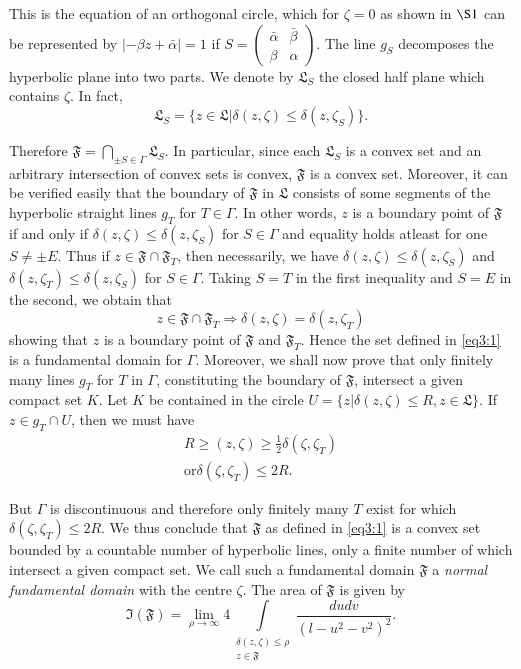 This is the equation of an orthogonal circle, which for $\zeta = 0$ as
shown in $\S 1$ can be represented by $|-\beta z + \bar{\alpha}|=1$ if
$S = \left(\begin{smallmatrix}  \bar{\alpha} & \bar{\beta}\\
\beta & \alpha
\end{smallmatrix}\right)$. The line $g_S$ decomposes the hyperbolic
plane into two parts. We denote by $\mathfrak{L}_S$ the closed half
plane which contains $\zeta$. In fact, 
$$
\mathfrak{L}_S = \{z\in \mathfrak{L} |\delta(z,\zeta) \leq \delta
(z,\zeta_S)\}. 
$$

Therefore $\mathfrak{F} = \bigcap\limits_{\pm S \in \Gamma}
\mathfrak{L}_S$. In particular, since each $\mathfrak{L}_S$ is a
convex set and an arbitrary intersection of convex sets is convex,
$\mathfrak{F}$ is a convex set. Moreover, it can be verified easily
that the boundary of $\mathfrak{F}$ in $\mathfrak{L}$ consists of some
segments of the hyperbolic straight lines $g_T$ for $T \in
\Gamma$. In other words, $z$ is a boundary point of $\mathfrak{F}$ if
and only if $\delta(z,\zeta) \leq \delta (z, \zeta_S)$ for $S
\in \Gamma$ and equality holds atleast for one $S \neq \pm
E$. Thus if $z\in \mathfrak{F} \cap \mathfrak{F}_T$, then
necessarily, we have $\delta (z,\zeta)\leq \delta (z,\zeta_S)$ and
$\delta (z,\zeta_T) \leq \delta (z,\zeta_S)$ for $S\in
\Gamma$. Taking $S=T$ in the first inequality and $S=E$ in the second,
we obtain that 
$$
z \in \mathfrak{F} \cap \mathfrak{F}_T \Longrightarrow \delta
(z,\zeta) = \delta (z,\zeta_T)
$$
showing that $z$ is a boundary point of $\mathfrak{F}$ and
$\mathfrak{F}_T$. Hence the set defined in \eqref{eq3:1} is a fundamental
domain for $\Gamma$. Moreover, we shall now prove that only finitely
many lines $g_T$ for $T$ in $\Gamma$, constituting the boundary of
$\mathfrak{F}$, intersect a given compact set $K$. Let $K$ be
contained in the circle $U = \{z|\delta (z,\zeta) \leq R, z\in
\mathfrak{L}\}$. \pageoriginale If $z \in g_T \cap U$, then we
must have 
\begin{gather*}
R \geq (z,\zeta) \geq \frac{1}{2} \delta (\zeta, \zeta_T)\\
\text{or} \delta (\zeta, \zeta_T) \leq 2 R.
\end{gather*}

But $\Gamma$ is discontinuous and therefore only finitely many $T$
exist for which $\delta(\zeta, \zeta_T)\leq 2R$. We thus conclude
that $\mathfrak{F}$ as defined in \eqref{eq3:1} is a convex set bounded by a
countable number of hyperbolic lines, only a finite number of which
intersect a given compact set. We call such a fundamental domain
$\mathfrak{F}$ a \textit{normal fundamental domain} with the centre
$\zeta$. The area of $\mathfrak{F}$ is given by 
$$
\mathfrak{I} (\mathfrak{F}) =\lim\limits_{\rho\to \infty}
4\int\limits_{\substack{\delta(z,\zeta)\leq \rho\\z\in
    \mathfrak{F}}} \frac{du dv}{(l-u^2 -v^2)^2}.
$$

